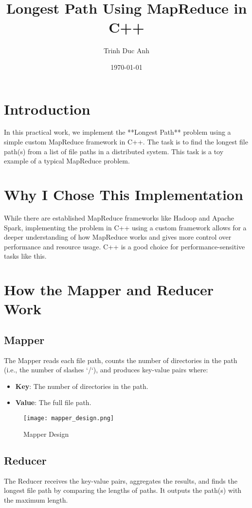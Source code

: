 \documentclass{article}
\title{Longest Path Using MapReduce in C++}
\author{Trinh Duc Anh}
\date{\today}
\begin{document}
\maketitle

\section{Introduction}
In this practical work, we implement the **Longest Path** problem using a simple custom MapReduce framework in C++. The task is to find the longest file path(s) from a list of file paths in a distributed system. This task is a toy example of a typical MapReduce problem.

\section{Why I Chose This Implementation}
While there are established MapReduce frameworks like Hadoop and Apache Spark, implementing the problem in C++ using a custom framework allows for a deeper understanding of how MapReduce works and gives more control over performance and resource usage. C++ is a good choice for performance-sensitive tasks like this.

\section{How the Mapper and Reducer Work}
\subsection{Mapper}
The Mapper reads each file path, counts the number of directories in the path (i.e., the number of slashes `/`), and produces key-value pairs where:
\begin{itemize}
    \item \textbf{Key}: The number of directories in the path.
    \item \textbf{Value}: The full file path.
\end{itemize}

\begin{figure}[h!]
\centering
\texttt{[image: mapper\_design.png]}
\caption{Mapper Design}
\end{figure}

\subsection{Reducer}
The Reducer receives the key-value pairs, aggregates the results, and finds the longest file path by comparing the lengths of paths. It outputs the path(s) with the maximum length.
\end{document}
